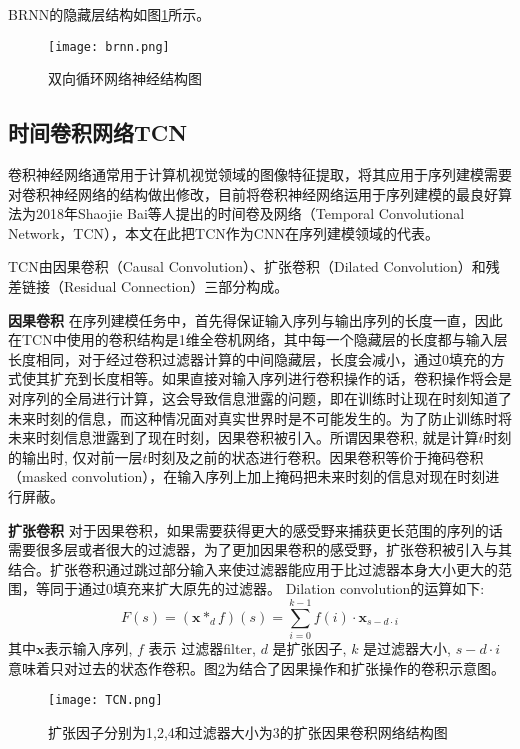 BRNN的隐藏层结构如图\ref{fig:brnn}所示。
\begin{figure}[htb]
  \centering
  \texttt{[image: brnn.png]}\\
  \caption{双向循环网络神经结构图}
  \label{fig:brnn}
\end{figure}

\subsection{时间卷积网络TCN}
卷积神经网络通常用于计算机视觉领域的图像特征提取，将其应用于序列建模需要对卷积神经网络的结构做出修改，目前将卷积神经网络运用于序列建模的最良好算法为2018年Shaojie Bai等人提出的时间卷及网络（Temporal Convolutional Network，TCN）\cite{TCN2018}，本文在此把TCN作为CNN在序列建模领域的代表。

TCN由因果卷积（Causal Convolution）、扩张卷积（Dilated Convolution）和残差链接（Residual Connection）三部分构成。

\textbf{因果卷积}
在序列建模任务中，首先得保证输入序列与输出序列的长度一直，因此在TCN中使用的卷积结构是1维全卷机网络，其中每一个隐藏层的长度都与输入层长度相同，对于经过卷积过滤器计算的中间隐藏层，长度会减小，通过0填充的方式使其扩充到长度相等。如果直接对输入序列进行卷积操作的话，卷积操作将会是对序列的全局进行计算，这会导致信息泄露的问题，即在训练时让现在时刻知道了未来时刻的信息，而这种情况面对真实世界时是不可能发生的。为了防止训练时将未来时刻信息泄露到了现在时刻，因果卷积被引入。所谓因果卷积, 就是计算$t$时刻的输出时, 仅对前一层$t$时刻及之前的状态进行卷积。因果卷积等价于掩码卷积（masked convolution）\cite{DBLP:journals/corr/OordKK16}，在输入序列上加上掩码把未来时刻的信息对现在时刻进行屏蔽。

\textbf{扩张卷积}
对于因果卷积，如果需要获得更大的感受野来捕获更长范围的序列的话需要很多层或者很大的过滤器，为了更加因果卷积的感受野，扩张卷积被引入与其结合。扩张卷积通过跳过部分输入来使过滤器能应用于比过滤器本身大小更大的范围，等同于通过0填充来扩大原先的过滤器。
Dilation convolution的运算如下:
$$
  F(s)=\left(\mathbf{x} *_{d} f\right)(s)=\sum_{i=0}^{k-1} f(i) \cdot \mathbf{x}_{s-d \cdot i}
$$
其中$\mathbf {x}$表示输入序列, $f$ 表示 过滤器filter, $d$ 是扩张因子,%
 $k$ 是过滤器大小,  $s-d\cdot i$意味着只对过去的状态作卷积。图\ref{fig:TCN}为结合了因果操作和扩张操作的卷积示意图。
\begin{figure}[htb]
  \centering
  \texttt{[image: TCN.png]}\\
  \caption{扩张因子分别为1,2,4和过滤器大小为3的扩张因果卷积网络结构图}
  \label{fig:TCN}
\end{figure}

